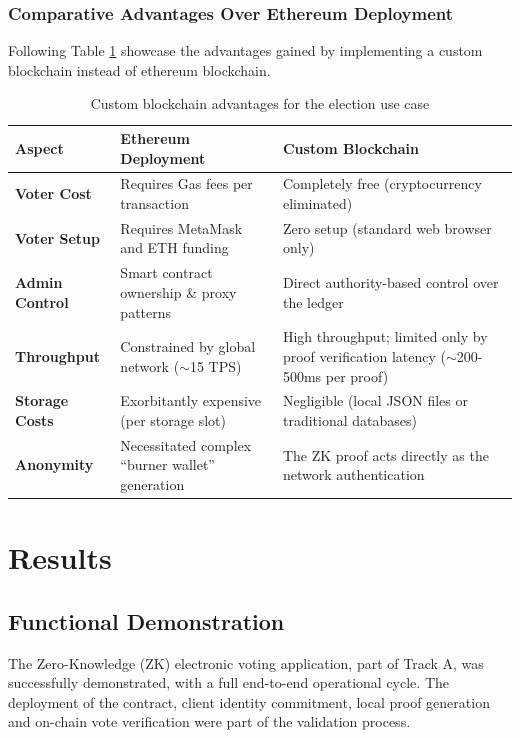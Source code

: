 \documentclass[12pt, a4paper]{report}
\begin{document}
\subsection{Comparative Advantages Over Ethereum Deployment}

Following Table \ref{tab:custom_advantages} showcase the advantages gained by implementing a custom blockchain instead of ethereum blockchain.

\begin{table}[H]
\centering
\caption{Custom blockchain advantages for the election use case}
\label{tab:custom_advantages}
\begin{tabular}{|l|p{5cm}|p{6.5cm}|}
\hline
\textbf{Aspect} & \textbf{Ethereum Deployment} & \textbf{Custom Blockchain} \\ \hline
\textbf{Voter Cost} & Requires Gas fees per transaction & Completely free (cryptocurrency eliminated) \\ \hline
\textbf{Voter Setup} & Requires MetaMask and ETH funding & Zero setup (standard web browser only) \\ \hline
\textbf{Admin Control} & Smart contract ownership \& proxy patterns & Direct authority-based control over the ledger \\ \hline
\textbf{Throughput} & Constrained by global network ($\sim$15 TPS) & High throughput; limited only by proof verification latency ($\sim$200-500ms per proof) \\ \hline
\textbf{Storage Costs} & Exorbitantly expensive (per storage slot) & Negligible (local JSON files or traditional databases) \\ \hline
\textbf{Anonymity} & Necessitated complex ``burner wallet'' generation & The ZK proof acts directly as the network authentication \\ \hline
\end{tabular}
\end{table}


\chapter{Results}

\section{Functional Demonstration}

The Zero-Knowledge (ZK) electronic voting application, part of Track A, was successfully demonstrated, with a full end-to-end operational cycle. The deployment of the contract, client identity commitment, local proof generation and on-chain vote verification were part of the validation process.
\end{document}
